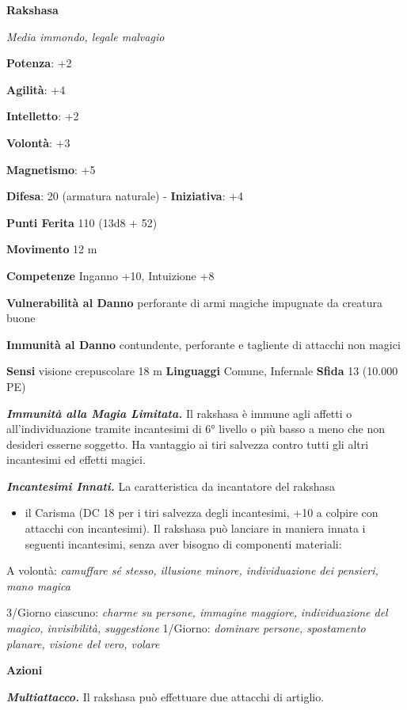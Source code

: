 \begin{multicols}{2}
\textbf{Rakshasa}

\emph{Media immondo, legale malvagio}

\textbf{Potenza}: +2

\textbf{Agilità}: +4

\textbf{Intelletto}: +2

\textbf{Volontà}: +3

\textbf{Magnetismo}: +5

\textbf{Difesa}: 20 (armatura naturale) - \textbf{Iniziativa}: +4

\textbf{Punti Ferita} 110 (13d8 + 52)

\textbf{Movimento} 12 m

\textbf{Competenze} Inganno +10, Intuizione +8

\textbf{Vulnerabilità al Danno} perforante di armi magiche impugnate da
creatura buone

\textbf{Immunità al Danno} contundente, perforante e tagliente di
attacchi non magici

\textbf{Sensi} visione crepuscolare 18 m
\textbf{Linguaggi} Comune, Infernale \textbf{Sfida} 13 (10.000 PE)

\emph{\textbf{Immunità alla Magia Limitata.}} Il rakshasa è immune agli
affetti o all'individuazione tramite incantesimi di 6° livello o più
basso a meno che non desideri esserne soggetto. Ha vantaggio ai tiri
salvezza contro tutti gli altri incantesimi ed effetti magici.

\emph{\textbf{Incantesimi Innati.}} La caratteristica da incantatore del
rakshasa


\begin{itemize}
\item
  il Carisma (DC 18 per i tiri salvezza degli incantesimi, +10 a colpire
  con attacchi con incantesimi). Il rakshasa può lanciare in maniera
  innata i seguenti incantesimi, senza aver bisogno di componenti
  materiali:
\end{itemize}


A volontà: \emph{camuffare sé stesso, illusione minore, individuazione}
\emph{dei pensieri, mano magica}

3/Giorno ciascuno: \emph{charme su persone, immagine maggiore,}
\emph{individuazione del magico, invisibilità, suggestione} 1/Giorno:
\emph{dominare persone, spostamento planare, visione del} \emph{vero,
volare}

\textbf{Azioni}

\emph{\textbf{Multiattacco.}} Il rakshasa può effettuare due attacchi di
artiglio.


\end{multicols}

